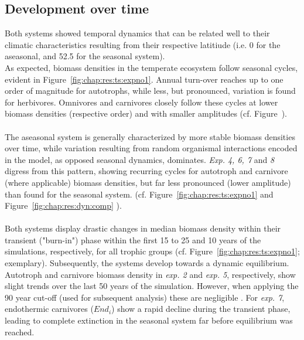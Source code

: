 \subsection{Development over time}
\label{chap:res:dyn:temporal}
Both systems showed temporal dynamics that can be related well to their climatic characteristics resulting from their respective latitiude (i.e. 0 for the aseasonal, and 52.5 for the seasonal system).\\
As expected, biomass densities in the temperate ecosystem follow seasonal cycles, evident in Figure~\ref{fig:chap:res:ts:expno1}.
 Annual turn-over reaches up to one order of magnitude for autotrophs, while less, but pronounced, variation is found for herbivores.
  Omnivores and carnivores closely follow these cycles  at lower biomass densities (respective order) and with smaller amplitudes (cf. Figure~). \\\\
  The aseasonal system is generally characterized by more stable biomass densities over time, while variation resulting from random organismal interactions encoded in the model, as opposed seasonal dynamics, dominates. 
  \textit{Exp. 4, 6, 7} and \textit{8} digress from this pattern, showing recurring cycles for autotroph and carnivore (where applicable) biomass densities, but far less  pronounced (lower amplitude) than found for the seasonal system. 
(cf. Figure~\ref{fig:chap:res:ts:expno1} and Figure~\ref{fig:chap:res:dyn:comp}
 ).\\\\
Both systems display drastic changes in median biomass density within their transient ("burn-in") phase within the first 15 to 25 and 10 years of the simulations, respectively, for all trophic groups (cf. Figure~\ref{fig:chap:res:ts:expno1}; exemplary). 
Subsequently, the systems develop towards a dynamic equilibrium. 
Autotroph and carnivore  biomass density in \textit{exp. 2} and \textit{exp. 5}, respectively, show slight trends over the last 50 years of the simulation. 
However, when applying the 90 year cut-off (used for subsequent analysis) these are negligible . For \textit{exp. 7}, endothermic carnivores ($End_i$) show a rapid decline during the transient phase, leading to complete extinction in the seasonal system far before equilibrium was reached.
